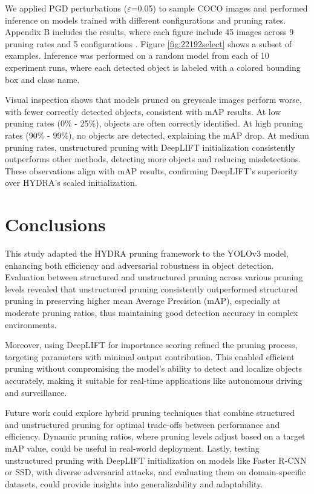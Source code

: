\documentclass[10pt]{cai}
\begin{document}
We applied PGD perturbations ($\varepsilon$=0.05) to sample COCO images and performed inference on models trained with different configurations and pruning rates. Appendix B includes the results, where each figure include 45 images across 9 pruning rates and 5 configurations \cite{MyAppendix}. Figure \ref{fig:22192select} shows a subset of examples. Inference was performed on a random model from each of 10 experiment runs, where each detected object is labeled with a colored bounding box and class name.

Visual inspection shows that models pruned on greyscale images perform worse, with fewer correctly detected objects, consistent with mAP results. At low pruning rates (0\% - 25\%), objects are often correctly identified. At high pruning rates (90\% - 99\%), no objects are detected, explaining the mAP drop. At medium pruning rates, unstructured pruning with DeepLIFT initialization consistently outperforms other methods, detecting more objects and reducing misdetections. These observations align with mAP results, confirming DeepLIFT's superiority over HYDRA's scaled initialization.


\section{Conclusions}
This study adapted the HYDRA pruning framework to the YOLOv3 model, enhancing both efficiency and adversarial robustness in object detection. Evaluation between structured and unstructured pruning across various pruning levels revealed that unstructured pruning consistently outperformed structured pruning in preserving higher mean Average Precision (mAP), especially at moderate pruning ratios, thus maintaining good detection accuracy in complex environments. 

Moreover, using DeepLIFT for importance scoring refined the pruning process, targeting parameters with minimal output contribution. This enabled efficient pruning without compromising the model's ability to detect and localize objects accurately, making it suitable for real-time applications like autonomous driving and surveillance.

Future work could explore hybrid pruning techniques that combine structured and unstructured pruning for optimal trade-offs between performance and efficiency. Dynamic pruning ratios, where pruning levels adjust based on a target mAP value, could be useful in real-world deployment. Lastly, testing unstructured pruning with DeepLIFT initialization on models like Faster R-CNN or SSD, with diverse adversarial attacks, and evaluating them on domain-specific datasets, could provide insights into generalizability and adaptability.
\end{document}
